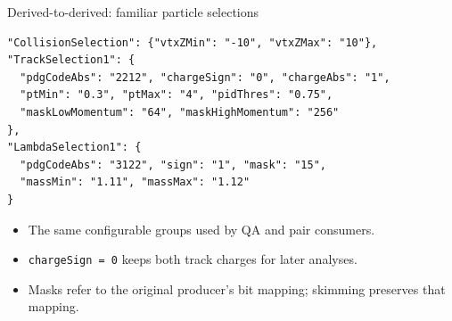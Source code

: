 \begin{frame}[fragile]{Derived-to-derived: familiar particle selections}
 \begin{lstlisting}
"CollisionSelection": {"vtxZMin": "-10", "vtxZMax": "10"},
"TrackSelection1": {
  "pdgCodeAbs": "2212", "chargeSign": "0", "chargeAbs": "1",
  "ptMin": "0.3", "ptMax": "4", "pidThres": "0.75",
  "maskLowMomentum": "64", "maskHighMomentum": "256"
},
"LambdaSelection1": {
  "pdgCodeAbs": "3122", "sign": "1", "mask": "15",
  "massMin": "1.11", "massMax": "1.12"
}
 \end{lstlisting}
 \begin{itemize}
 \item The same configurable groups used by QA and pair consumers.
 \item \texttt{chargeSign = 0} keeps both track charges for later analyses.
 \item Masks refer to the original producer's bit mapping; skimming preserves that mapping.
 \end{itemize}
\end{frame}

